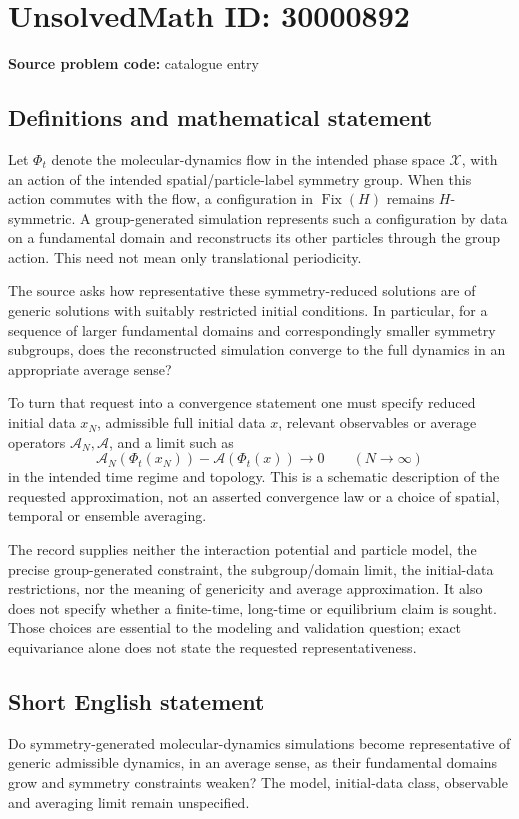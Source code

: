 \documentclass[11pt]{article}
\begin{document}
\section*{UnsolvedMath ID: 30000892}
\textbf{Source problem code:} catalogue entry
\subsection{Definitions and mathematical statement}
Let $\Phi_t$ denote the molecular-dynamics flow in the intended phase space $\mathcal X$, with an action of the intended spatial/particle-label symmetry group. When this action commutes with the flow, a configuration in $\operatorname{Fix}(H)$ remains $H$-symmetric. A group-generated simulation represents such a configuration by data on a fundamental domain and reconstructs its other particles through the group action. This need not mean only translational periodicity.

The source asks how representative these symmetry-reduced solutions are of generic solutions with suitably restricted initial conditions. In particular, for a sequence of larger fundamental domains and correspondingly smaller symmetry subgroups, does the reconstructed simulation converge to the full dynamics in an appropriate average sense?

To turn that request into a convergence statement one must specify reduced initial data $x_N$, admissible full initial data $x$, relevant observables or average operators $\mathcal A_N,\mathcal A$, and a limit such as
\[
\mathcal A_N(\Phi_t(x_N))-\mathcal A(\Phi_t(x))\longrightarrow0
\qquad(N\to\infty)
\]
in the intended time regime and topology. This is a schematic description of the requested approximation, not an asserted convergence law or a choice of spatial, temporal or ensemble averaging.

The record supplies neither the interaction potential and particle model, the precise group-generated constraint, the subgroup/domain limit, the initial-data restrictions, nor the meaning of genericity and average approximation. It also does not specify whether a finite-time, long-time or equilibrium claim is sought. Those choices are essential to the modeling and validation question; exact equivariance alone does not state the requested representativeness.
\subsection{Short English statement}
Do symmetry-generated molecular-dynamics simulations become representative of generic admissible dynamics, in an average sense, as their fundamental domains grow and symmetry constraints weaken? The model, initial-data class, observable and averaging limit remain unspecified.
\end{document}
